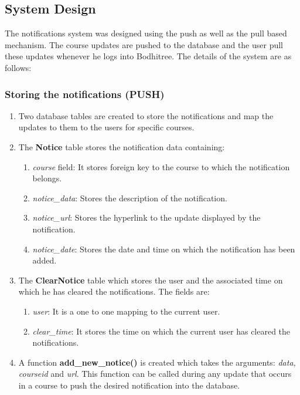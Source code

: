 \subsection{System Design}

\hspace{0.35cm} The notifications system was designed using the push as well as the pull based mechanism. The course updates are pushed to the database and the user pull these updates whenever he logs into Bodhitree. The details of the system are as follows: 

\subsubsection{Storing the notifications (PUSH)}

\begin{enumerate}
	\item Two database tables are created to store the notifications and map the updates to them to the users for specific courses.
	\item The \textbf{Notice} table stores the notification data containing:
	\begin{enumerate}
		\item \textit{course} field: It stores foreign key to the course to which the notification belongs.
		\item \textit{notice\_data}: Stores the description of the notification.
		\item \textit{notice\_url}: Stores the hyperlink to the update displayed by the notification.
		\item \textit{notice\_date}: Stores the date and time on which the notification has been added. 
	\end{enumerate}
	\item The \textbf{ClearNotice} table which stores the user and the associated time on which he has cleared the notifications. The fields are:
	\begin{enumerate}
		\item \textit{user}: It is a one to one mapping to the current user.
		\item \textit{clear\_time}: It stores the time on which the current user has cleared the notifications.
	\end{enumerate}
	\item A function \textbf{add\_new\_notice()} is created which takes the arguments: \textit{data, courseid} and \textit{url}. This function can be called during any update that occurs in a course to push the desired notification into the database.
\end{enumerate}

